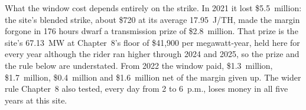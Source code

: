 What the window cost depends entirely on the strike. In 2021 it lost \$5.5~million: the site's blended strike, about \$720 at its average 17.95~J/TH, made the margin forgone in 176 hours dwarf a transmission prize of \$2.8~million. That prize is the site's 67.13~MW at Chapter~8's floor of \$41,900 per megawatt-year, held here for every year although the rider ran higher through 2024 and 2025, so the prize and the rule below are understated. From 2022 the window paid, \$1.3~million, \$1.7~million, \$0.4~million and \$1.6~million net of the margin given up. %
The wider rule Chapter~8 also tested, every day from 2 to 6~p.m., loses money in all five years at this site. %

